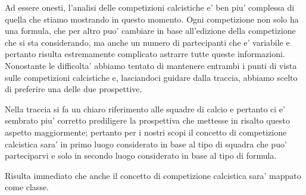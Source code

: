 Ad essere onesti, l'analisi delle competizioni calcistiche e' ben piu' complessa di quella
che stiamo mostrando in questo momento. Ogni competizione non solo ha una formula, che per altro
puo' cambiare in base all'edizione della competizione che si sta considerando, ma anche un numero
di partecipanti che e' variabile e pertanto risulta estremamente complicato astrarre tutte
queste informazioni.
Nonostante le difficolta' abbiamo tentato di mantenere entrambi i punti di vista sulle
competizioni calcistiche e, lasciandoci guidare dalla traccia, abbiamo scelto di preferire una
delle due prospettive.

Nella traccia si fa un chiaro riferimento alle squadre di calcio e pertanto ci e' sembrato
piu' corretto prediligere la prospettiva che mettesse in risalto questo aspetto maggiormente;
pertanto per i nostri scopi il concetto di competizione calcistica sara' in primo luogo
considerato in base al tipo di squadra che puo' parteciparvi e solo in secondo luogo
considerato in base al tipo di formula.

Risulta immediato che anche il concetto di competizione calcistica sara' mappato come classe.

